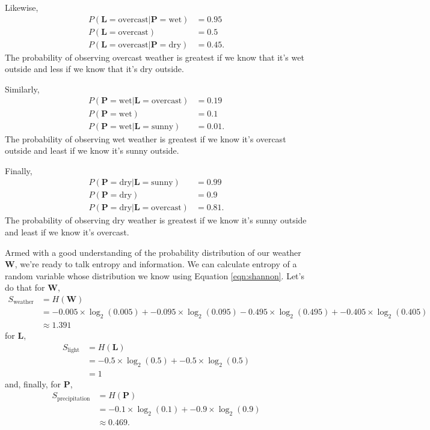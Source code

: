 Likewise,
\begin{align*}
P(\bm{L} = \text{overcast} | \bm{P} = \text{wet}) &= 0.95 \\
P(\bm{L} = \text{overcast}) &= 0.5 \\
P(\bm{L} = \text{overcast} | \bm{P} = \text{dry}) &= 0.45.
\end{align*}
The probability of observing overcast weather is greatest if we know that it's wet outside and less if we know that it's dry outside.

Similarly,
\begin{align*}
P(\bm{P} = \text{wet} | \bm{L} = \text{overcast}) &= 0.19 \\
P(\bm{P} = \text{wet}) &= 0.1 \\
P(\bm{P} = \text{wet} | \bm{L} = \text{sunny}) &= 0.01.
\end{align*}
The probability of observing wet weather is greatest if we know it's overcast outside and least if we know it's sunny outside.

Finally,
\begin{align*}
P(\bm{P} = \text{dry} | \bm{L} = \text{sunny}) &= 0.99 \\
P(\bm{P} = \text{dry}) &= 0.9 \\
P(\bm{P} = \text{dry} | \bm{L} = \text{overcast}) &= 0.81.
\end{align*}
The probability of observing dry weather is greatest if we know it's sunny outside and least if we know it's overcast.

Armed with a good understanding of the probability distribution of our weather $\bm{W}$, we're ready to talk entropy and information.
We can calculate entropy of a random variable whose distribution we know using Equation \ref{eqn:shannon}.
Let's do that for $\bm{W}$,
\begin{align*}
S_{\text{weather}}
&=
H(\bm{W}) \\
&=
- 0.005 \times \log_2(0.005)
+ - 0.095 \times \log_2(0.095)
- 0.495 \times \log_2(0.495)
+ - 0.405 \times \log_2(0.405) \\
&\approx 1.391
\end{align*}
for $\bm{L}$,
\begin{align*}
  S_{\text{light}}
  &=
  H(\bm{L}) \\
  &=
  - 0.5 \times \log_2(0.5)
  + - 0.5 \times \log_2(0.5) \\
  &= 1
\end{align*}
and, finally, for $\bm{P}$,
\begin{align*}
  S_{\text{precipitation}}
  &=
  H(\bm{P}) \\
  &=
  - 0.1 \times \log_2(0.1)
  + - 0.9 \times \log_2(0.9) \\
  &\approx 0.469.
\end{align*}

